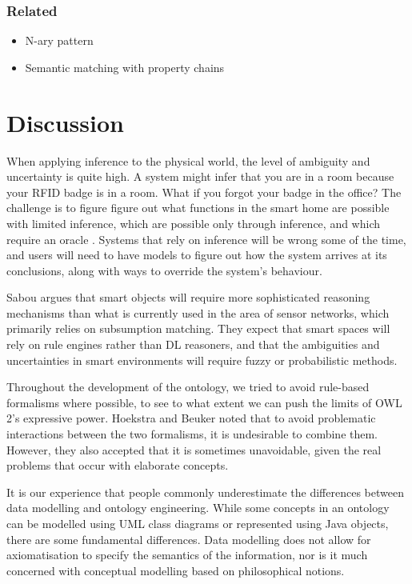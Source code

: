 \subsubsection{Related} 

\begin{itemize}
	\item N-ary pattern 
	\item Semantic matching with property chains
\end{itemize}


\section{Discussion}

When applying inference to the physical world, the level of ambiguity and uncertainty is quite high. A system might infer that you are in a room because your RFID badge is in a room. What if you forgot your badge in the office? The challenge is to figure figure out what functions in the smart home are possible with limited inference, which are possible only through inference, and which require an oracle \cite{Edwards2001}. Systems that rely on inference will be wrong some of the time, and users will need to have models to figure out how the system arrives at its conclusions, along with ways to override the system's behaviour.

Sabou \cite{Sabou2010} argues that smart objects will require more sophisticated reasoning mechanisms than what is currently used in the area of sensor networks, which primarily relies on subsumption matching. They expect that smart spaces will rely on rule engines rather than DL reasoners, and that the ambiguities and uncertainties in smart environments will require fuzzy or probabilistic methods.

Throughout the development of the ontology, we tried to avoid rule-based formalisms where possible, to see to what extent we can push the limits of OWL 2's expressive power. Hoekstra and Beuker \cite{Hoekstra2008} noted that to avoid problematic interactions between the two formalisms, it is undesirable to combine them. However, they also accepted that it is sometimes unavoidable, given the real problems that occur with elaborate concepts. 

It is our experience that people commonly underestimate the differences between data modelling and ontology engineering. While some concepts in an ontology can be modelled using UML class diagrams or represented using Java objects, there are some fundamental differences. Data modelling does not allow for axiomatisation to specify the semantics of the information, nor is it much concerned with conceptual modelling based on philosophical notions. 

